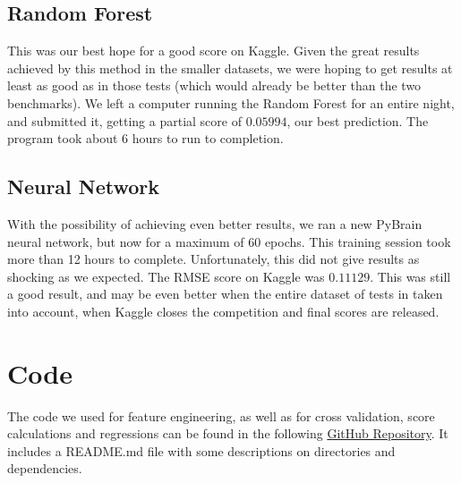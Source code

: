 \documentclass[10pt]{article}
\begin{document}
\subsection{Random Forest}

This was our best hope for a good score on Kaggle. Given the great results
achieved by this method in the smaller datasets, we were hoping to get results
at least as good as in those tests (which would already be better than the two
benchmarks). We left a computer running the Random Forest for an entire night,
and submitted it, getting a partial score of $0.05994$, our best prediction.
The program took about 6 hours to run to completion.

\subsection{Neural Network}

With the possibility of achieving even better results, we ran a new PyBrain
neural network, but now for a maximum of 60 epochs. This training session
took more than 12 hours to complete. Unfortunately, this did not give results
as shocking as we expected. The RMSE score on Kaggle was $0.11129$. This
was still a good result, and may be even better when the entire dataset of
tests in taken into account, when Kaggle closes the competition and final
scores are released.

\section{Code}

The code we used for feature engineering, as well as for cross validation,
score calculations and regressions can be found in the following 
\href{https://github.com/victordomene/cs181-practicals/}{GitHub Repository}.
It includes a README.md file with some descriptions on directories and
dependencies.
\end{document}
